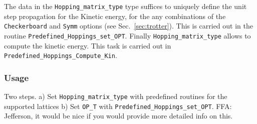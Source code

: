 The  data in the \texttt{Hopping\_matrix\_type} type suffices to uniquely define the  unit step propagation    for the Kinetic energy, for the  any combinations of the  \texttt{Checkerboard} and  \texttt{Symm}  options (see Sec.~\ref{sec:trotter}).   This is carried out in the routine \texttt{Predefined\_Hoppings\_set\_OPT}. 
Finally  \texttt{Hopping\_matrix\_type}     allows to compute the kinetic energy. This  task is carried out in  \texttt{Predefined\_Hoppings\_Compute\_Kin}.


\subsubsection{Usage}

Two steps. 
a)  Set  \texttt{Hopping\_matrix\_type}  with predefined routines for the supported lattices   b) Set \texttt{OP\_T}  with  \texttt{Predefined\_Hoppings\_set\_OPT}.   
{\color{red}FFA:  Jefferson, it would be nice if you would provide more detailed info on this. }

